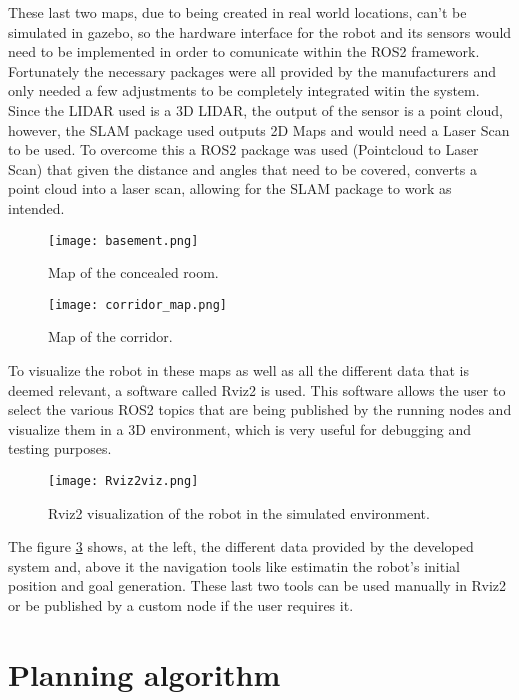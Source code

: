These last two maps, due to being created in real world locations, can't be 
simulated in gazebo, so the hardware interface for the robot and its sensors 
would need to be implemented in order to comunicate within the \gls{ROS2} framework. 
Fortunately the necessary packages were all provided by the manufacturers \cite{ScoutRepo, RoboSense} and only needed a few adjustments to 
be completely integrated witin the system. Since the LIDAR used is a 3D LIDAR, the output 
of the sensor is a point cloud, however, the \gls{SLAM} package used outputs 2D Maps and would need a 
Laser Scan to be used. To overcome this a \gls{ROS2} package was used (Pointcloud to Laser Scan) that 
given the distance and angles that need to be covered, converts a point cloud into a laser scan, 
allowing for the \gls{SLAM} package to work as intended.
\begin{figure}[H]
    \centering
    \texttt{[image: basement.png]}
    \caption{Map of the concealed room.}
    \label{fig:basement_map}
\end{figure}
\begin{figure}[H]
    \centering
    \texttt{[image: corridor\_map.png]}
    \caption{Map of the corridor.}
    \label{fig:corridor_map}
\end{figure}

To visualize the robot in these maps as well as all the different data that is deemed relevant, a software called 
Rviz2 is used. This software allows the user to select the various \gls{ROS2} topics that are being published 
by the running nodes and visualize them in a 3D environment, which is very useful for debugging and testing purposes.
\begin{figure}[H]
    \centering
    \texttt{[image: Rviz2viz.png]}
    \caption{Rviz2 visualization of the robot in the simulated environment.}
    \label{fig:rviz2_visualization}
\end{figure}

The figure \ref{fig:rviz2_visualization} shows, at the left, the different data provided by the developed system and, above it the 
navigation tools like estimatin the robot's initial position and goal generation. These last two tools can be used manually 
in Rviz2 or be published by a custom node if the user requires it.

\section{Planning algorithm}
\label{sec:planning_algorithm}

